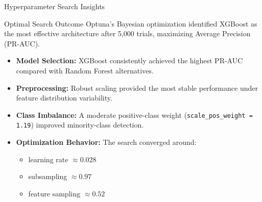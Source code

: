 \begin{frame}{Hyperparameter Search Insights}

\begin{block}{Optimal Search Outcome}
\small
Optuna's Bayesian optimization identified XGBoost as the most
effective architecture after 5,000 trials, maximizing
Average Precision (PR-AUC).
\end{block}

\vspace{0.2cm}

\begin{itemize}
    \item \textbf{Model Selection:} XGBoost consistently achieved the highest PR-AUC compared with Random Forest alternatives.

    \item \textbf{Preprocessing:} Robust scaling provided the most stable performance under feature distribution variability.

    \item \textbf{Class Imbalance:} A moderate positive-class weight
    (\texttt{scale\_pos\_weight = 1.19}) improved minority-class detection.

    \item \textbf{Optimization Behavior:} The search converged around:
    \begin{itemize}
        \item learning rate $\approx 0.028$
        \item subsampling $\approx 0.97$
        \item feature sampling $\approx 0.52$
    \end{itemize}

\end{itemize}

\end{frame}

